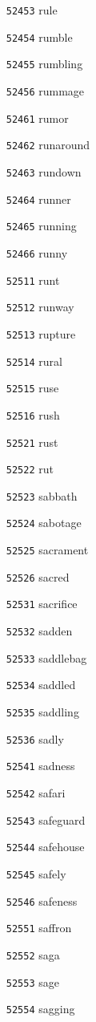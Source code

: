 \documentclass[twoside,11pt]{article}
\begin{document}
\begin{multicols}{5}
\begin{enumerate}
\item[\texttt{52453}] rule
\item[\texttt{52454}] rumble
\item[\texttt{52455}] rumbling
\item[\texttt{52456}] rummage
\item[\texttt{52461}] rumor
\item[\texttt{52462}] runaround
\item[\texttt{52463}] rundown
\item[\texttt{52464}] runner
\item[\texttt{52465}] running
\item[\texttt{52466}] runny
\item[\texttt{52511}] runt
\item[\texttt{52512}] runway
\item[\texttt{52513}] rupture
\item[\texttt{52514}] rural
\item[\texttt{52515}] ruse
\item[\texttt{52516}] rush
\item[\texttt{52521}] rust
\item[\texttt{52522}] rut
\item[\texttt{52523}] sabbath
\item[\texttt{52524}] sabotage
\item[\texttt{52525}] sacrament
\item[\texttt{52526}] sacred
\item[\texttt{52531}] sacrifice
\item[\texttt{52532}] sadden
\item[\texttt{52533}] saddlebag
\item[\texttt{52534}] saddled
\item[\texttt{52535}] saddling
\item[\texttt{52536}] sadly
\item[\texttt{52541}] sadness
\item[\texttt{52542}] safari
\item[\texttt{52543}] safeguard
\item[\texttt{52544}] safehouse
\item[\texttt{52545}] safely
\item[\texttt{52546}] safeness
\item[\texttt{52551}] saffron
\item[\texttt{52552}] saga
\item[\texttt{52553}] sage
\item[\texttt{52554}] sagging

\end{enumerate}
\end{multicols}
\end{document}

